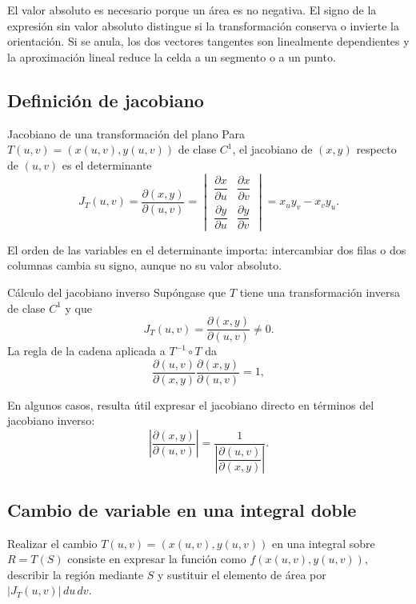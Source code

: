 El valor absoluto es necesario porque un área es no negativa. El signo de la expresión sin valor absoluto distingue si la transformación conserva o invierte la orientación. Si se anula, los dos vectores tangentes son linealmente dependientes y la aproximación lineal reduce la celda a un segmento o a un punto.

\subsection{Definición de jacobiano}

\begin{mydefinition}{Jacobiano de una transformación del plano}
Para $T(u,v)=(x(u,v),y(u,v))$ de clase $C^1$, el jacobiano de $(x,y)$ respecto de $(u,v)$ es el determinante
\[
J_T(u,v)=\frac{\partial(x,y)}{\partial(u,v)}
=\begin{vmatrix}
\dfrac{\partial x}{\partial u}&\dfrac{\partial x}{\partial v}\\[4pt]
\dfrac{\partial y}{\partial u}&\dfrac{\partial y}{\partial v}
\end{vmatrix}
=x_u y_v-x_v y_u.
\]
\end{mydefinition}

El orden de las variables en el determinante importa: intercambiar dos filas o dos columnas cambia su signo, aunque no su valor absoluto.

\begin{mynote}{Cálculo del jacobiano inverso}
Supóngase que $T$ tiene una transformación inversa de clase $C^1$ y que
\[
J_T(u,v)=\frac{\partial(x,y)}{\partial(u,v)}\ne0.
\]
La regla de la cadena aplicada a $T^{-1}\circ T$ da
\[
\frac{\partial(u,v)}{\partial(x,y)}
\frac{\partial(x,y)}{\partial(u,v)}=1,
\]

En algunos casos, resulta útil expresar el jacobiano directo en términos del jacobiano inverso:
\[
\left|\frac{\partial(x,y)}{\partial(u,v)}\right|
=\frac{1}{\left|\dfrac{\partial(u,v)}{\partial(x,y)}\right|}.
\]
\end{mynote}

\subsection{Cambio de variable en una integral doble}

Realizar el cambio $T(u,v)=(x(u,v),y(u,v))$ en una integral sobre $R=T(S)$ consiste en expresar la función como $f(x(u,v),y(u,v))$, describir la región mediante $S$ y sustituir el elemento de área por $|J_T(u,v)|\,du\,dv$.

